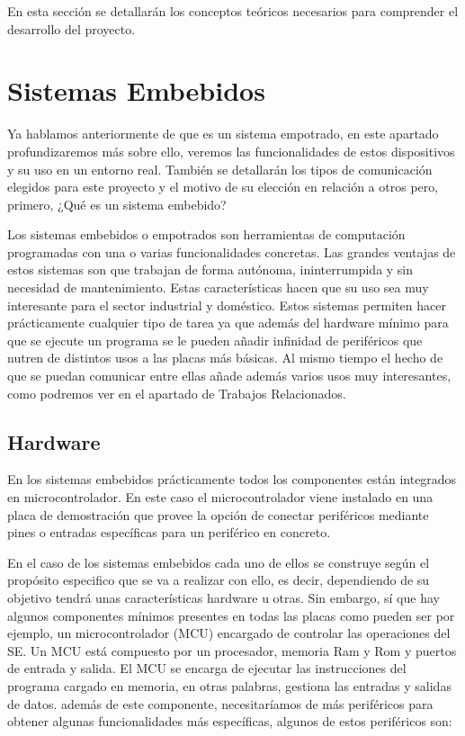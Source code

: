 
En esta sección se detallarán los conceptos teóricos necesarios para comprender el desarrollo del proyecto. 

\section{Sistemas Embebidos}\label{sec:SE}

Ya hablamos anteriormente de que es un sistema empotrado, en este apartado profundizaremos más sobre ello, veremos las funcionalidades de estos dispositivos y su uso en un entorno real. También se detallarán los tipos de comunicación elegidos para este proyecto y el motivo de su elección en relación a otros pero, primero, ¿Qué es un sistema embebido?

Los sistemas embebidos o empotrados son herramientas de computación programadas con una o varias funcionalidades concretas. 
Las grandes ventajas de estos sistemas son que trabajan de forma autónoma, ininterrumpida y sin necesidad de mantenimiento. Estas características hacen que su uso sea muy interesante para el sector industrial y doméstico. Estos sistemas permiten hacer prácticamente cualquier tipo de tarea ya que además del hardware mínimo para que se ejecute un programa se le pueden añadir infinidad de periféricos que nutren de distintos usos a las placas más básicas. Al mismo tiempo el hecho de que se puedan comunicar entre ellas añade además varios usos muy interesantes, como podremos ver en el apartado de Trabajos Relacionados.
 
\subsection{Hardware}\label{sec:Hardware}

En los sistemas embebidos prácticamente todos los componentes están integrados en microcontrolador. En este caso el microcontrolador viene instalado en una placa de demostración que provee la opción de conectar periféricos mediante pines o entradas específicas para un periférico en concreto. 



En el caso de los sistemas embebidos cada uno de ellos se construye según el propósito especifico que se va a realizar con ello, es decir, dependiendo de su objetivo tendrá unas características hardware u otras. Sin embargo, sí que hay algunos componentes mínimos presentes en todas las placas como pueden ser por ejemplo, un microcontrolador (MCU) encargado de controlar las operaciones del SE. Un MCU está compuesto por un procesador, memoria Ram y Rom y puertos de entrada y salida. 
El MCU se encarga de ejecutar las instrucciones del programa cargado en memoria, en otras palabras, gestiona las entradas y salidas de datos. además de este componente, necesitaríamos de más periféricos para obtener algunas funcionalidades más específicas, algunos de estos periféricos son:

